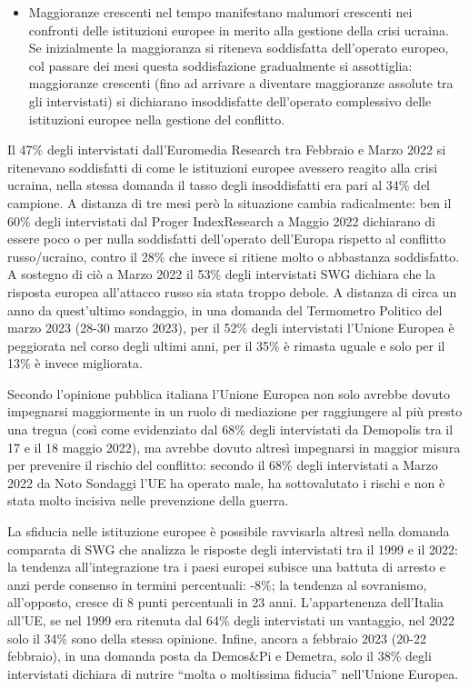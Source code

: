 \documentclass[
  openany]{book}
\providecommand{\tightlist}{%
  \setlength{\itemsep}{0pt}\setlength{\parskip}{0pt}}
\begin{document}
\begin{itemize}
\tightlist
\item
  Maggioranze crescenti nel tempo manifestano malumori crescenti nei confronti delle istituzioni europee in merito alla gestione della crisi ucraina. Se inizialmente la maggioranza si riteneva soddisfatta dell'operato europeo, col passare dei mesi questa soddisfazione gradualmente si assottiglia: maggioranze crescenti (fino ad arrivare a diventare maggioranze assolute tra gli intervistati) si dichiarano insoddisfatte dell'operato complessivo delle istituzioni europee nella gestione del conflitto.
\end{itemize}

Il 47\% degli intervistati dall'Euromedia Research tra Febbraio e Marzo 2022 si ritenevano soddisfatti di come le istituzioni europee avessero reagito alla crisi ucraina, nella stessa domanda il tasso degli insoddisfatti era pari al 34\% del campione. A distanza di tre mesi però la situazione cambia radicalmente: ben il 60\% degli intervistati dal Proger IndexResearch a Maggio 2022 dichiarano di essere poco o per nulla soddisfatti dell'operato dell'Europa rispetto al conflitto russo/ucraino, contro il 28\% che invece si ritiene molto o abbastanza soddisfatto. A sostegno di ciò a Marzo 2022 il 53\% degli intervistati SWG dichiara che la risposta europea all'attacco russo sia stata troppo debole.
A distanza di circa un anno da quest'ultimo sondaggio, in una domanda del Termometro Politico del marzo 2023 (28-30 marzo 2023), per il 52\% degli intervistati l'Unione Europea è peggiorata nel corso degli ultimi anni, per il 35\% è rimasta uguale e solo per il 13\% è invece migliorata.

Secondo l'opinione pubblica italiana l'Unione Europea non solo avrebbe dovuto impegnarsi maggiormente in un ruolo di mediazione per raggiungere al più presto una tregua (così come evidenziato dal 68\% degli intervistati da Demopolis tra il 17 e il 18 maggio 2022), ma avrebbe dovuto altresì impegnarsi in maggior misura per prevenire il rischio del conflitto: secondo il 68\% degli intervistati a Marzo 2022 da Noto Sondaggi l'UE ha operato male, ha sottovalutato i rischi e non è stata molto incisiva nelle prevenzione della guerra.

La sfiducia nelle istituzione europee è possibile ravvisarla altresì nella domanda comparata di SWG che analizza le risposte degli intervistati tra il 1999 e il 2022: la tendenza all'integrazione tra i paesi europei subisce una battuta di arresto e anzi perde consenso in termini percentuali: -8\%; la tendenza al sovranismo, all'opposto, cresce di 8 punti percentuali in 23 anni. L'appartenenza dell'Italia all'UE, se nel 1999 era ritenuta dal 64\% degli intervistati un vantaggio, nel 2022 solo il 34\% sono della stessa opinione. Infine, ancora a febbraio 2023 (20-22 febbraio), in una domanda posta da Demos\&Pi e Demetra, solo il 38\% degli intervistati dichiara di nutrire ``molta o moltissima fiducia'' nell'Unione Europea.
\end{document}
